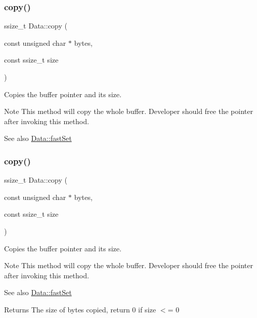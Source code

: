 \subsubsection{\texorpdfstring{copy()}{copy()}\hspace{0.1cm}{\footnotesize\ttfamily [1/2]}}
{\footnotesize\ttfamily ssize\+\_\+t Data\+::copy (\begin{DoxyParamCaption}\item[{const unsigned char $\ast$}]{bytes,  }\item[{const ssize\+\_\+t}]{size }\end{DoxyParamCaption})}

Copies the buffer pointer and its size. \begin{DoxyNote}{Note}
This method will copy the whole buffer. Developer should free the pointer after invoking this method. 
\end{DoxyNote}
\begin{DoxySeeAlso}{See also}
\hyperlink{classData_ad679f9c8cdff29d6a18c56fa9b70064a}{Data\+::fast\+Set} 
\end{DoxySeeAlso}
\mbox{\label{classData_a11d09c86fa7696d0cd89c0fe08970bf8}} 
\subsubsection{\texorpdfstring{copy()}{copy()}\hspace{0.1cm}{\footnotesize\ttfamily [2/2]}}
{\footnotesize\ttfamily ssize\+\_\+t Data\+::copy (\begin{DoxyParamCaption}\item[{const unsigned char $\ast$}]{bytes,  }\item[{const ssize\+\_\+t}]{size }\end{DoxyParamCaption})}

Copies the buffer pointer and its size. \begin{DoxyNote}{Note}
This method will copy the whole buffer. Developer should free the pointer after invoking this method. 
\end{DoxyNote}
\begin{DoxySeeAlso}{See also}
\hyperlink{classData_ad679f9c8cdff29d6a18c56fa9b70064a}{Data\+::fast\+Set} 
\end{DoxySeeAlso}
\begin{DoxyReturn}{Returns}
The size of bytes copied, return 0 if size $<$= 0 
\end{DoxyReturn}
\mbox{\label{classData_ad679f9c8cdff29d6a18c56fa9b70064a}} 
